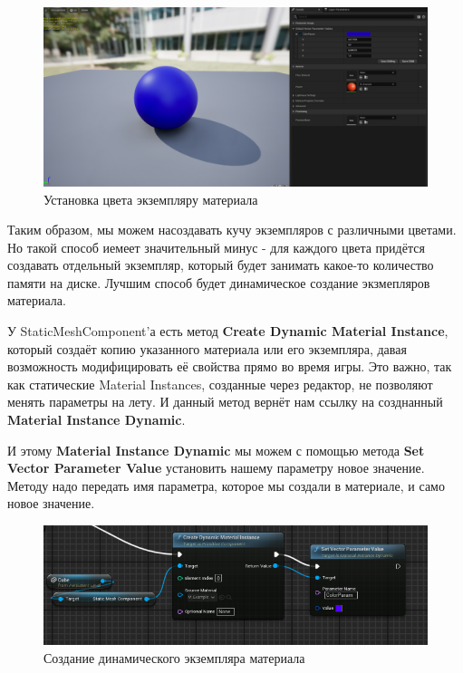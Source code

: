 \begin{figure}[h]
    \centering
    \includegraphics[width=\textwidth]{Lections/Lection_2/MaterailInst.png}
    \caption{Установка цвета экземпляру материала}
\end{figure}

Таким образом, мы можем насоздавать кучу экземпляров с различными цветами.
Но такой способ иемеет значительный минус - для каждого цвета придётся 
создавать отдельный экземпляр, который будет занимать какое-то количество памяти
на диске. Лучшим способ будет динамическое создание экзмепляров материала.

У StaticMeshComponent'а есть метод \textbf{Create Dynamic Material Instance},
который создаёт копию указанного материала или его экземпляра, давая возможность 
модифицировать её свойства прямо во время игры. Это важно, так как статические 
Material Instances, созданные через редактор, не позволяют менять параметры на лету.
И данный метод вернёт нам ссылку на созднанный \textbf{Material Instance Dynamic}.

И этому \textbf{Material Instance Dynamic} мы можем с помощью метода \textbf{
Set Vector Parameter Value} установить нашему параметру новое значение. 
Методу надо передать имя параметра, которое мы создали в материале, и 
само новое значение.

\begin{figure}[h]
    \centering
    \includegraphics[width=\textwidth]{Lections/Lection_2/CreatedynamicMat.png}
    \caption{Создание динамического экземпляра материала}
\end{figure}

